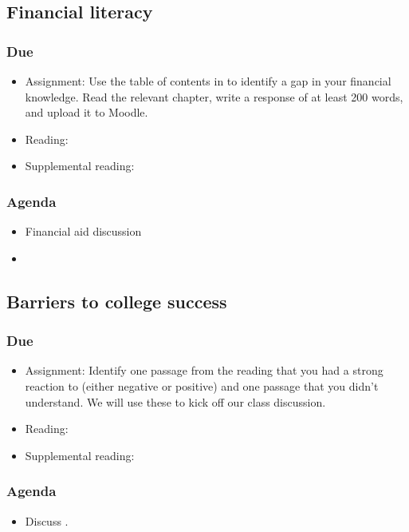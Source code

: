 \documentclass[12pt,article,oneside]{memoir}
\begin{document}
\subsection{Financial literacy}
\subsubsection{Due}
\begin{itemize}
 \item Assignment: Use the table of contents in \cite{everyday} to identify a gap in your financial knowledge.  Read the relevant chapter, write a response of at least 200 words, and upload it to Moodle.
 \item Reading: \cite{finra}
 \item Supplemental reading: \cite{smart}
\end{itemize}

\subsubsection{Agenda}
\begin{itemize}
\item Financial aid discussion
\item 
\end{itemize}



\subsection{Barriers to college success}
\subsubsection{Due}
\begin{itemize}
 \item Assignment: Identify one passage from the reading that you had a strong reaction to (either negative or positive) and one passage that you didn't understand.  We will use these to kick off our class discussion.
 \item Reading: \cite{guillory2008s}
 \item Supplemental reading: \cite{rosenberg}
\end{itemize}

\subsubsection{Agenda}
\begin{itemize}
\item Discuss \cite{guillory2008s}.
\end{itemize}
\end{document}

